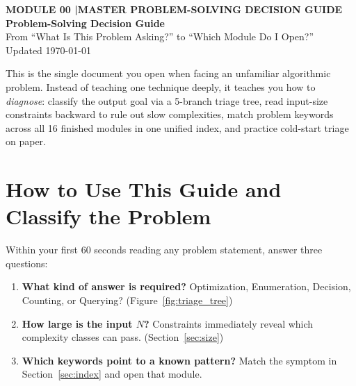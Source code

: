 \documentclass[11pt,a4paper]{article}
\newcommand{\sectionbreak}{}
\begin{document}
\thispagestyle{plain}
\begin{tcolorbox}[
    enhanced,
    colback=primaryblue!6, colframe=primaryblue!20,
    borderline west={5pt}{0pt}{primaryblue},
    arc=4pt, boxrule=0.6pt,
    left=14pt, right=14pt, top=7pt, bottom=7pt,
    before skip=0pt, after skip=5pt
]
    {\footnotesize\bfseries\color{accentteal}MODULE 00 \quad|\quad MASTER PROBLEM-SOLVING DECISION GUIDE}\\[3pt]
    {\Huge\bfseries\color{primaryblue}Problem-Solving Decision Guide}\\[3pt]
    {\large\color{codegray}From ``What Is This Problem Asking?'' to ``Which Module Do I Open?''}\\[4pt]
    {\footnotesize\color{codegray}Updated \today}
\end{tcolorbox}

\begin{overviewbox}
This is the single document you open when facing an unfamiliar algorithmic problem. Instead of teaching one technique deeply, it teaches you how to \emph{diagnose}: classify the output goal via a 5-branch triage tree, read input-size constraints backward to rule out slow complexities, match problem keywords across all 16 finished modules in one unified index, and practice cold-start triage on paper.
\end{overviewbox}

\vspace{-5pt}
{\setlength{\parskip}{0pt}\footnotesize\tableofcontents}

\renewcommand{\sectionbreak}{\clearpage}

\section{How to Use This Guide and Classify the Problem}
\label{sec:tree}

Within your first 60 seconds reading any problem statement, answer three questions:
\begin{enumerate}
    \item \textbf{What kind of answer is required?} Optimization, Enumeration, Decision, Counting, or Querying? (Figure~\ref{fig:triage_tree})
    \item \textbf{How large is the input $N$?} Constraints immediately reveal which complexity classes can pass. (Section~\ref{sec:size})
    \item \textbf{Which keywords point to a known pattern?} Match the symptom in Section~\ref{sec:index} and open that module.
\end{enumerate}
\end{document}
